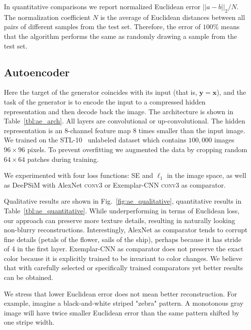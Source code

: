 \documentclass{article}
\newcommand{\conv}{\textsc{conv}}
\newcommand{\ourapproach}{DeePSiM }
\newcommand{\inp}{\mathbf{x}}
\newcommand{\targ}{\mathbf{y}}
\newcommand{\ltwo}{SE }
\newcommand{\lone}{$\ell_1$ }
\begin{document}
In quantitative comparisons we report normalized Euclidean error $||a-b||_2 / N$.
The normalization coefficient $N$ is the average of Euclidean distances between all pairs of different samples from the test set.
Therefore, the error of $100 \%$ means that the algorithm performs the same as randomly drawing a sample from the test set.

\subsection{Autoencoder} \label{sec:exp_ae}

Here the target of the generator coincides with its input (that is, $\targ = \inp$), and the task of the generator is to encode the input to a compressed hidden representation and then decode back the image. 
The architecture is shown in Table~\ref{tbl:ae_arch}.
All layers are convolutional or up-convolutional.
The hidden representation is an $8$-channel feature map $8$ times smaller than the input image.
We trained on the STL-10~\citep{Coates_AISTATS2010} unlabeled dataset which contains $100,000$ images $96 \times 96$ pixels.
To prevent overfitting we augmented the data by cropping random $64 \times 64$ patches during training.

We experimented with four loss functions: \ltwo and \lone in the image space, as well as \ourapproach with AlexNet \conv3 or Exemplar-CNN \conv3 as comparator.

Qualitative results are shown in Fig.~\ref{fig:ae_qualitative}, quantitative results in Table~\ref{tbl:ae_quantitative}.
While underperforming in terms of Euclidean loss, our approach can preserve more texture details, resulting in naturally looking non-blurry reconstructions.
Interestingly, AlexNet as comparator tends to corrupt fine details (petals of the flower, sails of the ship), perhaps because it has stride of $4$ in the first layer.
Exemplar-CNN as comparator does not preserve the exact color because it is explicitly trained to be invariant to color changes. 
We believe that with carefully selected or specifically trained comparators yet better results can be obtained.

We stress that lower Euclidean error does not mean better reconstruction.
For example, imagine a black-and-white striped "zebra" pattern.
A monotonous gray image will have twice smaller Euclidean error than the same pattern shifted by one stripe width.
\end{document}
